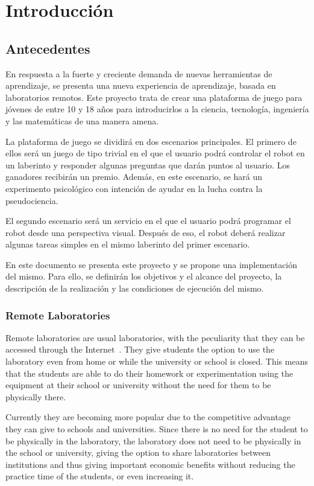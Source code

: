 \chapter{Introducción}

\section{Antecedentes}

En respuesta a la fuerte y creciente demanda de nuevas herramientas de aprendizaje, se presenta una
nueva experiencia de aprendizaje, basada en laboratorios remotos. Este proyecto trata de crear una
plataforma de juego para jóvenes de entre 10 y 18 años para introducirlos a la ciencia, tecnología,
ingeniería y las matemáticas de una manera amena.

La plataforma de juego se dividirá en dos escenarios principales. El primero de ellos será un juego
de tipo trivial en el que el usuario podrá controlar el robot en un laberinto y responder algunas
preguntas que darán puntos al usuario. Los ganadores recibirán un premio. Además, en este escenario,
se hará un experimento psicológico con intención de ayudar en la lucha contra la pseudociencia.

El segundo escenario será un servicio en el que el usuario podrá programar el robot desde una
perspectiva visual. Después de eso, el robot deberá realizar algunas tareas simples en el mismo
laberinto del primer escenario.

En este documento se presenta este proyecto y se propone una implementación del mismo. Para ello, se
definirán los objetivos y el alcance del proyecto, la descripción de la realización y las
condiciones de ejecución del mismo.

\subsection{Remote Laboratories}

Remote laboratories are usual laboratories, with the peculiarity that they can be accessed through
the Internet~\cite{remote_labs}. They give students the option to use the laboratory even from home
or while the university or school is closed. This means that the students are able to do their
homework or experimentation using the equipment at their school or university without the need for
them to be physically there.

Currently they are becoming more popular due to the competitive advantage they can give to schools
and universities. Since there is no need for the student to be physically in the laboratory, the
laboratory does not need to be physically in the school or university, giving the option to share
laboratories between institutions and thus giving important economic benefits without reducing
the practice time of the students, or even increasing it.

